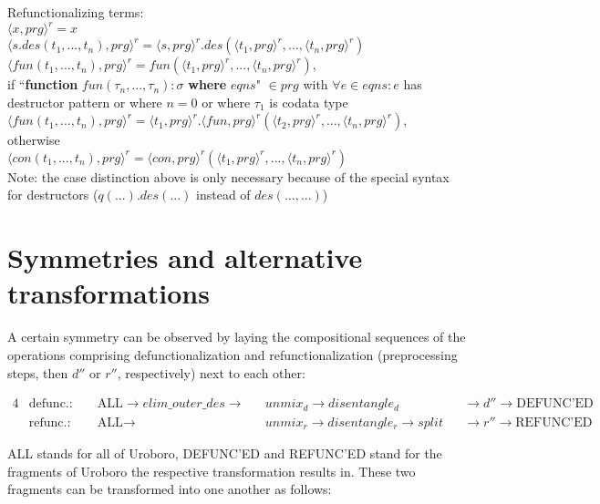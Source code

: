 \documentclass[11pt]{article} %
\begin{document}
Refunctionalizing terms: \\
$\langle x, prg \rangle^r = x$ \\
$\langle s.des(t_1, ..., t_n), prg \rangle^r = \langle s, prg \rangle^r .des(\langle t_1, prg \rangle^r, ..., \langle t_n, prg \rangle^r)$ \\
$\langle fun(t_1, ..., t_n), prg \rangle^r = fun(\langle t_1, prg \rangle^r, ..., \langle t_n, prg \rangle^r)$, \\
if ``\textbf{function} $fun(\tau_n, ..., \tau_n): \sigma$ \textbf{where} $eqns$" $\in prg$  with $\forall e \in eqns: e$ has destructor pattern or where $n = 0$ or where $\tau_1$ is codata type  \\
$\langle fun(t_1, ..., t_n), prg \rangle^r = \langle t_1, prg \rangle^r .\langle fun, prg \rangle^r (\langle t_2, prg \rangle^r, ..., \langle t_n, prg \rangle^r)$, \\
otherwise \\
$\langle con(t_1, ..., t_n), prg \rangle^r = \langle con, prg \rangle^r (\langle t_1, prg \rangle^r, ..., \langle t_n, prg \rangle^r)$ \\

Note: the case distinction above is only necessary because of the special syntax for destructors ($q(...).des(...)$ instead of $des(..., ...)$)

\section{Symmetries and alternative transformations}

A certain symmetry can be observed by laying the compositional sequences of the operations comprising defunctionalization and refunctionalization (preprocessing steps, then $d''$ or $r''$, respectively) next to each other:

\begin{alignat*}{4}
&\textrm{defunc.: } &&\textrm{ALL} \rightarrow  elim\_outer\_des \rightarrow && unmix_d \rightarrow disentangle_d && \rightarrow d'' \rightarrow \textrm{DEFUNC'ED} \\
&\textrm{refunc.: } &&\textrm{ALL} \rightarrow && unmix_r \rightarrow disentangle_r \rightarrow split && \rightarrow r'' \rightarrow \textrm{REFUNC'ED}
\end{alignat*}

ALL stands for all of Uroboro, DEFUNC'ED and REFUNC'ED stand for the fragments of Uroboro the respective transformation results in. These two fragments can be transformed into one another as follows:
\end{document}
